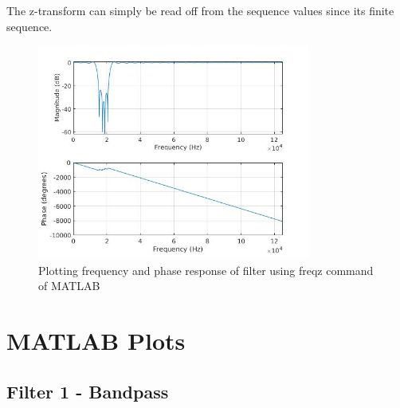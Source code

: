 \documentclass[12pt]{article}
\begin{document}
The z-transform can simply be read off from the sequence values since its finite sequence.
\begin{figure}[h!]
	\centering
    \includegraphics[width = 0.8\textwidth]{2fir.jpg}
    \caption{Plotting frequency and phase response of filter using freqz command of MATLAB}
\end{figure}
\newpage
\section{MATLAB Plots}
\subsection{Filter 1 - Bandpass}
\end{document}
